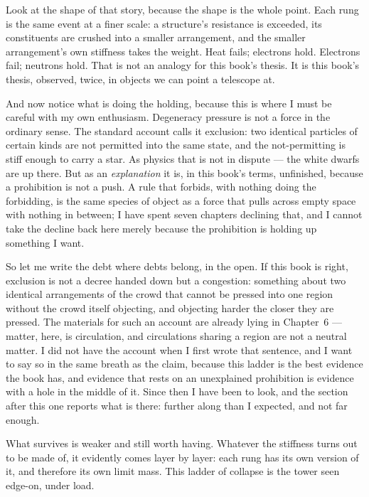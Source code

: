 Look at the shape of that story, because the shape is the whole point. Each rung is the same event at a finer scale: a structure's resistance is exceeded, its constituents are crushed into a smaller arrangement, and the smaller arrangement's own stiffness takes the weight. Heat fails; electrons hold. Electrons fail; neutrons hold. That is not an analogy for this book's thesis. It is this book's thesis, observed, twice, in objects we can point a telescope at.

And now notice what is doing the holding, because this is where I must be careful with my own enthusiasm. Degeneracy pressure is not a force in the ordinary sense. The standard account calls it exclusion: two identical particles of certain kinds are not permitted into the same state, and the not-permitting is stiff enough to carry a star. As physics that is not in dispute --- the white dwarfs are up there. But as an \emph{explanation} it is, in this book's terms, unfinished, because a prohibition is not a push. A rule that forbids, with nothing doing the forbidding, is the same species of object as a force that pulls across empty space with nothing in between; I have spent seven chapters declining that, and I cannot take the decline back here merely because the prohibition is holding up something I want.

So let me write the debt where debts belong, in the open. If this book is right, exclusion is not a decree handed down but a congestion: something about two identical arrangements of the crowd that cannot be pressed into one region without the crowd itself objecting, and objecting harder the closer they are pressed. The materials for such an account are already lying in Chapter~6 --- matter, here, is circulation, and circulations sharing a region are not a neutral matter. I did not have the account when I first wrote that sentence, and I want to say so in the same breath as the claim, because this ladder is the best evidence the book has, and evidence that rests on an unexplained prohibition is evidence with a hole in the middle of it. Since then I have been to look, and the section after this one reports what is there: further along than I expected, and not far enough.

What survives is weaker and still worth having. Whatever the stiffness turns out to be made of, it evidently comes layer by layer: each rung has its own version of it, and therefore its own limit mass. This ladder of collapse is the tower seen edge-on, under load.


